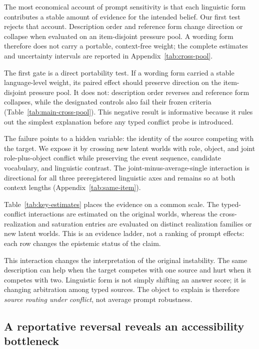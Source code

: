 The most economical account of prompt sensitivity is that each linguistic form
contributes a stable amount of evidence for the intended belief. Our first test
rejects that account. Description order and reference form change direction or
collapse when evaluated on an item-disjoint pressure pool. A wording form
therefore does not carry a portable, context-free weight; the complete estimates
and uncertainty intervals are reported in Appendix~\ref{tab:cross-pool}.

The first gate is a direct portability test. If a wording form carried a stable
language-level weight, its paired effect should preserve direction on the
item-disjoint pressure pool. It does not: description order reverses and
reference form collapses, while the designated controls also fail their frozen
criteria (Table~\ref{tab:main-cross-pool}). This negative result is informative
because it rules out the simplest explanation before any typed conflict probe is
introduced.



The failure points to a hidden variable: the identity of the source competing
with the target. We expose it by crossing new latent worlds with role, object,
and joint role-plus-object conflict while preserving the event sequence,
candidate vocabulary, and linguistic contrast. The joint-minus-average-single
interaction is directional for all three preregistered linguistic axes and
remains so at both context lengths (Appendix~\ref{tab:same-item}).

Table~\ref{tab:key-estimates} places the evidence on a common scale. The
typed-conflict interactions are estimated on the original worlds, whereas the
cross-realization and saturation entries are evaluated on distinct realization
families or new latent worlds. This is an evidence ladder, not a ranking of
prompt effects: each row changes the epistemic status of the claim.



This interaction changes the interpretation of the original instability. The
same description can help when the target competes with one source and hurt when
it competes with two. Linguistic form is not simply shifting an answer score; it
is changing arbitration among typed sources. The object to explain is therefore
\emph{source routing under conflict}, not average prompt robustness.

\subsection{A reportative reversal reveals an accessibility bottleneck}

